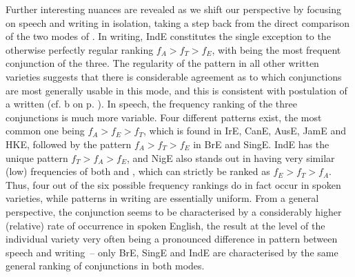 Further interesting nuances are revealed as we shift our perspective by focusing on speech and writing in isolation, taking a step back from the direct comparison of the two modes of . In writing, IndE constitutes the single exception to the otherwise perfectly regular ranking $f_A > f_T > f_E$, with  being the most frequent conjunction of the three. The regularity of the pattern in all other written varieties suggests that there is considerable agreement as to which conjunctions are most generally usable in this mode, and this is consistent with  postulation of a written  (cf. b on p. \pageref{bkm:Ref497947644}). In speech, the frequency ranking of the three conjunctions is much more variable. Four different patterns exist, the most common one being $f_A > f_E > f_T$, which is found in IrE, CanE, AusE, JamE and HKE, followed by the pattern $f_A > f_T > f_E$ in BrE and SingE. IndE has the unique pattern $f_T > f_A > f_E$, and NigE also stands out in having very similar (low) frequencies of both  and , which can strictly be ranked as $f_E > f_T > f_A$. Thus, four out of the six possible frequency rankings do in fact occur in spoken varieties, while patterns in writing are essentially uniform. From a general perspective, the conjunction  seems to be characterised by a considerably higher (relative) rate of occurrence in spoken English, the result at the level of the individual variety very often being a pronounced difference in pattern between speech and writing~– only BrE, SingE and IndE are characterised by the same general ranking of conjunctions in both modes.

